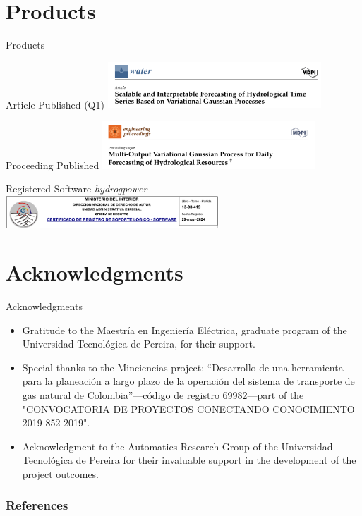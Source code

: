 \documentclass[10pt, xcolor=table]{beamer}
\let\olditem\item
\renewcommand\item{\olditem\justifying}
\begin{document}
\section*{Products}
\begin{frame}{Products}
	\begin{block}{Article Published (Q1)}
		\centering
		\includegraphics[width=0.6\textwidth]{images/article.png}
	\end{block}
	
	\begin{block}{Proceeding Published}
		\centering
		\includegraphics[width=0.6\textwidth]{images/proceeding.png}
	\end{block}

	\begin{block}{Registered Software \textit{hydrogpower}}
		\centering
		\includegraphics[width=0.6\textwidth]{images/software.png}
	\end{block}
	
\end{frame}

\section*{Acknowledgments}
\begin{frame}{Acknowledgments}
	\begin{itemize}
		\item Gratitude to the Maestría en Ingeniería Eléctrica, graduate program of the Universidad Tecnológica de Pereira, for their support.
		
		\item Special thanks to the Minciencias project: “Desarrollo de una herramienta para la planeación a largo plazo de la operación del sistema de transporte de gas natural de Colombia”—código de registro 69982—part of the "CONVOCATORIA DE PROYECTOS CONECTANDO CONOCIMIENTO 2019 852-2019".
		
		\item Acknowledgment to the Automatics Research Group of the Universidad Tecnológica de Pereira for their invaluable support in the development of the project outcomes.
	\end{itemize}
\end{frame}



\tiny
\begin{frame}
	\raggedleft
	\frametitle{References}
	
	
\end{frame}
\end{document}
